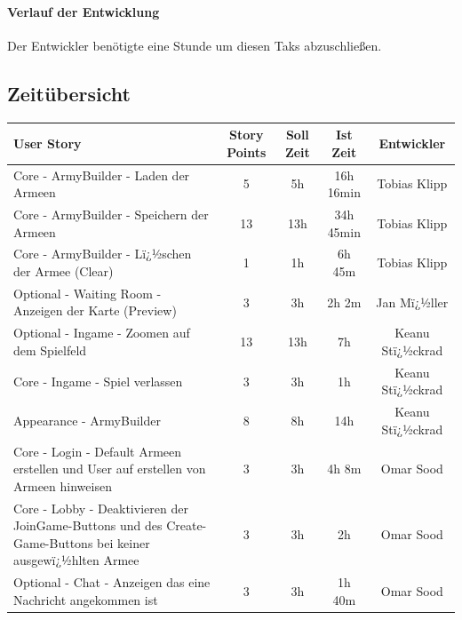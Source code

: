 \documentclass[12pt, titlepage]{scrartcl}
\begin{document}
			\paragraph{Verlauf der Entwicklung} Der Entwickler benötigte eine Stunde um diesen Taks abzuschließen.
			\newpage
			
			\subsection{Zeitübersicht}
			\begin{center}
				\begin{longtable}{p{6cm} c c c c }
					
					User Story	& Story Points & Soll Zeit & Ist Zeit & Entwickler\\
					\toprule
					\endhead
					Core - ArmyBuilder - Laden der Armeen & 5 & 5h & 16h 16min & Tobias Klipp \\ \hline 
					
					Core - ArmyBuilder - Speichern der Armeen & 13 & 13h & 34h 45min & Tobias Klipp \\ \hline
					
					Core - ArmyBuilder - Lï¿½schen der Armee (Clear) & 1 & 1h & 6h 45m & Tobias Klipp \\ \hline
					
					Optional - Waiting Room - Anzeigen der Karte (Preview) & 3 & 3h & 2h 2m& Jan Mï¿½ller \\ \hline
					
					Optional - Ingame - Zoomen auf dem Spielfeld & 13 & 13h & 7h & Keanu Stï¿½ckrad \\ \hline
					
					Core - Ingame - Spiel verlassen & 3 & 3h & 1h & Keanu Stï¿½ckrad\\ \hline
					
					Appearance - ArmyBuilder & 8 & 8h & 14h & Keanu Stï¿½ckrad\\ \hline
					
					Core - Login - Default Armeen erstellen und User auf erstellen von Armeen hinweisen & 3 & 3h & 4h 8m & Omar Sood\\ \hline
					
					Core - Lobby - Deaktivieren der JoinGame-Buttons und des Create-Game-Buttons bei keiner ausgewï¿½hlten Armee & 3 & 3h & 2h & Omar Sood\\ \hline
					
					Optional - Chat - Anzeigen das eine Nachricht angekommen ist  & 3 & 3h & 1h 40m & Omar Sood\\ \hline
					

\end{longtable}
\end{center}
\end{document}
